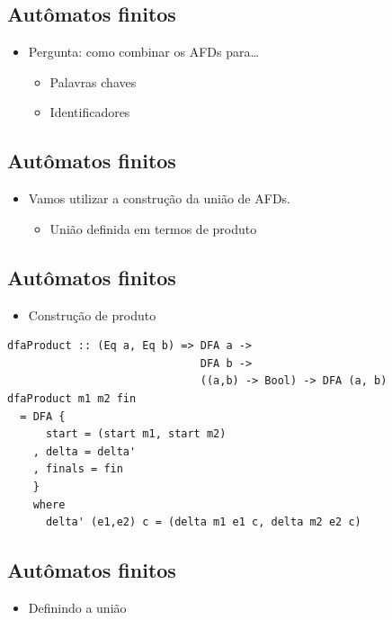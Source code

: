 \documentclass[11pt]{article}
\begin{document}
\subsection*{Autômatos finitos}
\label{sec:org76c6bb6}

\begin{itemize}
\item Pergunta: como combinar os AFDs para\ldots{}
\begin{itemize}
\item Palavras chaves
\item Identificadores
\end{itemize}
\end{itemize}
\subsection*{Autômatos finitos}
\label{sec:org96b7a68}

\begin{itemize}
\item Vamos utilizar a construção da união de AFDs.
\begin{itemize}
\item União definida em termos de produto
\end{itemize}
\end{itemize}
\subsection*{Autômatos finitos}
\label{sec:org18df0ab}

\begin{itemize}
\item Construção de produto
\end{itemize}

\begin{verbatim}
dfaProduct :: (Eq a, Eq b) => DFA a ->
                              DFA b ->
                              ((a,b) -> Bool) -> DFA (a, b)
dfaProduct m1 m2 fin
  = DFA {
      start = (start m1, start m2)
    , delta = delta'
    , finals = fin
    }
    where
      delta' (e1,e2) c = (delta m1 e1 c, delta m2 e2 c)  
\end{verbatim}
\subsection*{Autômatos finitos}
\label{sec:orgfee9b2c}

\begin{itemize}
\item Definindo a união
\end{itemize}
\end{document}
